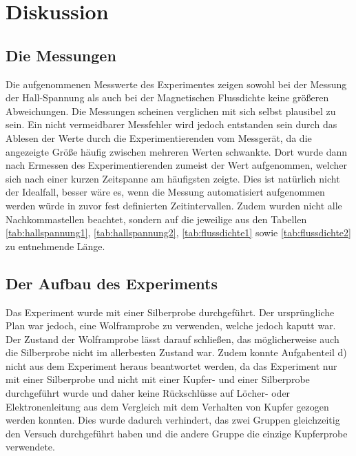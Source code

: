 \section{Diskussion}
\subsection{Die Messungen}
  Die aufgenommenen Messwerte des Experimentes zeigen sowohl bei der Messung der Hall-Spannung als auch
  bei der Magnetischen Flussdichte keine größeren Abweichungen. Die Messungen scheinen verglichen mit sich selbst
  plausibel zu sein. Ein nicht vermeidbarer Messfehler wird jedoch entstanden sein durch das Ablesen der Werte durch
  die Experimentierenden vom Messgerät, da die angezeigte Größe häufig zwischen mehreren Werten schwankte. Dort wurde
  dann nach Ermessen des Experimentierenden zumeist der Wert aufgenommen, welcher sich nach einer kurzen Zeitspanne am
  häufigsten zeigte. Dies ist natürlich nicht der Idealfall, besser wäre es, wenn die Messung automatisiert aufgenommen
  werden würde in zuvor fest definierten Zeitintervallen. Zudem wurden nicht alle Nachkommastellen beachtet, sondern auf
  die jeweilige aus den Tabellen \ref{tab:hallspannung1}, \ref{tab:hallspannung2}, \ref{tab:flussdichte1} sowie
  \ref{tab:flussdichte2} zu entnehmende Länge.
\subsection{Der Aufbau des Experiments}
  Das Experiment wurde mit einer Silberprobe durchgeführt. Der ursprüngliche Plan war jedoch, eine Wolframprobe zu
  verwenden, welche jedoch kaputt war. Der Zustand der Wolframprobe lässt darauf schließen, das möglicherweise auch die
  Silberprobe nicht im allerbesten Zustand war. Zudem konnte Aufgabenteil d) nicht aus dem Experiment heraus beantwortet
  werden, da das Experiment nur mit einer Silberprobe und nicht mit einer Kupfer- und einer Silberprobe durchgeführt
  wurde und daher keine Rückschlüsse auf Löcher- oder Elektronenleitung aus dem Vergleich mit dem Verhalten von Kupfer
  gezogen werden konnten. Dies wurde dadurch verhindert, das zwei Gruppen gleichzeitig den Versuch durchgeführt haben
  und die andere Gruppe die einzige Kupferprobe verwendete.
\label{sec:Diskussion}
